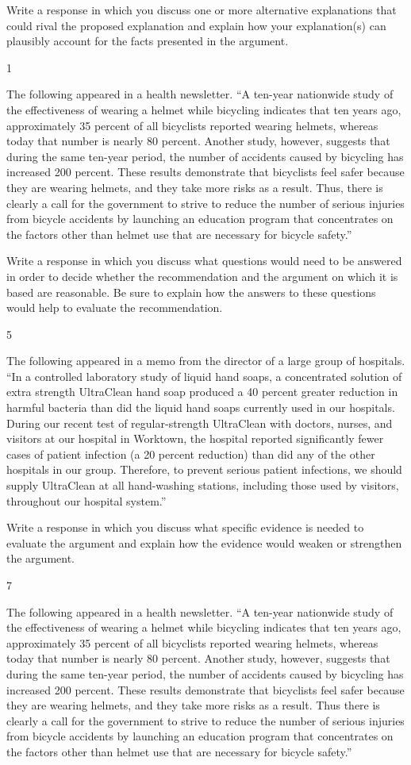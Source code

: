 \documentclass[]{article}
\begin{document}
Write a response in which you discuss one or more alternative
explanations that could rival the proposed explanation and explain how
your explanation(s) can plausibly account for the facts presented in the
argument.

1

The following appeared in a health newsletter. ``A ten-year nationwide
study of the effectiveness of wearing a helmet while bicycling indicates
that ten years ago, approximately 35 percent of all bicyclists reported
wearing helmets, whereas today that number is nearly 80 percent. Another
study, however, suggests that during the same ten-year period, the
number of accidents caused by bicycling has increased 200 percent. These
results demonstrate that bicyclists feel safer because they are wearing
helmets, and they take more risks as a result. Thus, there is clearly a
call for the government to strive to reduce the number of serious
injuries from bicycle accidents by launching an education program that
concentrates on the factors other than helmet use that are necessary for
bicycle safety.''

Write a response in which you discuss what questions would need to be
answered in order to decide whether the recommendation and the argument
on which it is based are reasonable. Be sure to explain how the answers
to these questions would help to evaluate the recommendation.

5

The following appeared in a memo from the director of a large group of
hospitals. ``In a controlled laboratory study of liquid hand soaps, a
concentrated solution of extra strength UltraClean hand soap produced a
40 percent greater reduction in harmful bacteria than did the liquid
hand soaps currently used in our hospitals. During our recent test of
regular-strength UltraClean with doctors, nurses, and visitors at our
hospital in Worktown, the hospital reported significantly fewer cases of
patient infection (a 20 percent reduction) than did any of the other
hospitals in our group. Therefore, to prevent serious patient
infections, we should supply UltraClean at all hand-washing stations,
including those used by visitors, throughout our hospital system.''

Write a response in which you discuss what specific evidence is needed
to evaluate the argument and explain how the evidence would weaken or
strengthen the argument.

7

The following appeared in a health newsletter. ``A ten-year nationwide
study of the effectiveness of wearing a helmet while bicycling indicates
that ten years ago, approximately 35 percent of all bicyclists reported
wearing helmets, whereas today that number is nearly 80 percent. Another
study, however, suggests that during the same ten-year period, the
number of accidents caused by bicycling has increased 200 percent. These
results demonstrate that bicyclists feel safer because they are wearing
helmets, and they take more risks as a result. Thus there is clearly a
call for the government to strive to reduce the number of serious
injuries from bicycle accidents by launching an education program that
concentrates on the factors other than helmet use that are necessary for
bicycle safety.''
\end{document}
